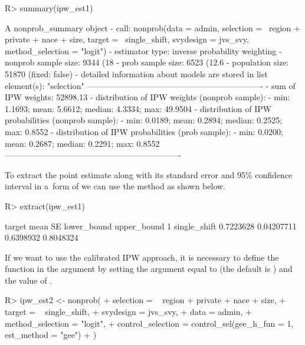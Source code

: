 \documentclass[nojss]{jss}
\begin{document}
\begin{CodeChunk}
\begin{CodeInput}
R> summary(ipw_est1)
\end{CodeInput}
\begin{CodeOutput}
A nonprob_summary object
 - call: nonprob(data = admin, selection = ~region + private + nace + 
    size, target = ~single_shift, svydesign = jvs_svy, 
    method_selection = "logit")
 - estimator type: inverse probability weighting
 - nonprob sample size: 9344 (18%
 - prob sample size: 6523 (12.6%
 - population size: 51870 (fixed: false)
 - detailed information about models are stored in list element(s): 
    "selection"
----------------------------------------------------------------
 - sum of IPW weights: 52898.13 
 - distribution of IPW weights (nonprob sample):
   - min: 1.1693; mean: 5.6612; median: 4.3334; max: 49.9504
 - distribution of IPW probabilities (nonprob sample):
   - min: 0.0189; mean: 0.2894; median: 0.2525; max: 0.8552
 - distribution of IPW probabilities (prob sample):
   - min: 0.0200; mean: 0.2687; median: 0.2291; max: 0.8552
----------------------------------------------------------------
\end{CodeOutput}
\end{CodeChunk}

To extract the point estimate along with its standard error and 95\%
confidence interval in a~form of  we can use the
 method as shown below.

\begin{CodeChunk}
\begin{CodeInput}
R> extract(ipw_est1)
\end{CodeInput}
\begin{CodeOutput}
        target      mean         SE lower_bound upper_bound
1 single_shift 0.7223628 0.04207711   0.6398932   0.8048324
\end{CodeOutput}
\end{CodeChunk}

If we want to use the calibrated IPW approach, it is necessary to define
the  function in the 
argument by setting the  argument equal to 
(the default is ) and the value of .

\begin{CodeChunk}
\begin{CodeInput}
R> ipw_est2 <- nonprob(
+   selection = ~ region + private + nace + size,
+   target = ~ single_shift,
+   svydesign = jvs_svy,
+   data = admin,
+   method_selection = "logit",
+   control_selection = control_sel(gee_h_fun = 1, est_method = "gee")
+ )
\end{CodeInput}
\end{CodeChunk}
\end{document}
